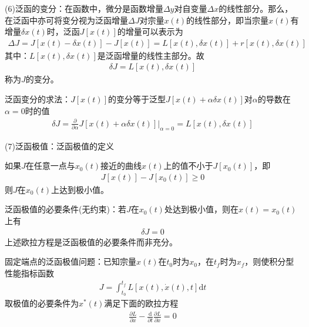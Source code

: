             \par
            (6)泛函的变分：在函数中，微分是函数增量$\Delta y$对自变量$\Delta x$的线性部分。那么，在泛函中亦可将变分视为泛函增量$\Delta J$对宗量$x(t)$的线性部分，即当宗量$x(t)$有增量$\delta x(t)$时，泛函$J[x(t)]$的增量可以表示为
            \begin{align*}
            \Delta J = J[x(t) - \delta x(t)] - J[x(t)] = L[x(t),\delta x(t)]+r[x(t),\delta x(t)]
            \end{align*}
            其中：$L[x(t),\delta x(t)]$是泛函增量的线性主部分。故
            \begin{align*}
            \delta J = L[x(t),\delta x(t)]
            \end{align*}
            称为$J$的变分。
            \par
            泛函变分的求法：$J[x(t)]$的变分等于泛型$J[x(t)+\alpha \delta x(t)]$对$\alpha$的导数在$\alpha=0$时的值
            \begin{align*}
            \delta J = \frac{\partial }{\partial \alpha}J[x(t)+\alpha \delta x(t)]\big|_{\alpha=0} = L[x(t),\delta x(t)]
            \end{align*}
            \par
            (7)泛函极值：泛函极值的定义
            \begin{definition}[泛函极值]
            如果$J$在任意一点与$x_0(t)$接近的曲线$x(t)$上的值不小于$J[x_0(t)]$，即
            \begin{align*}
            J[x(t)] - J[x_0(t)] \geqslant 0
            \end{align*}
            则$J$在$x_0(t)$上达到极小值。
            \end{definition}
            \par
            泛函极值的必要条件(无约束)：若$J$在$x_0(t)$处达到极小值，则在$x(t) = x_0(t)$上有
            \begin{align*}
            \delta J = 0
            \end{align*}
            上述欧拉方程是泛函极值的必要条件而非充分。
            \par
            固定端点的泛函极值问题：已知宗量$x(t)$在$t_0$时为$x_0$，在$t_f$时为$x_f$，则使积分型性能指标函数
            \begin{align*}
            J = \int_{t_0}^{t_f}L[x(t),\dot{x}(t),t]\mathrm{d}t
            \end{align*}
            取极值的必要条件为$x^*(t)$满足下面的欧拉方程
            \begin{align*}
            \frac{\partial L}{\partial x} - \frac{\mathrm{d} }{\partial t}\frac{\partial L}{\partial \dot{x}} = 0
            \end{align*}
